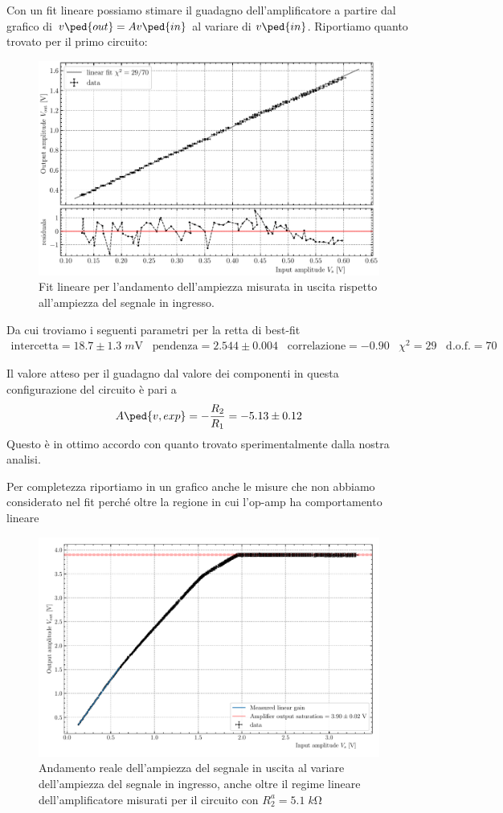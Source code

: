 \documentclass[10pt, a4paper, italian]{article}
\begin{document}
Con un fit lineare possiamo stimare il guadagno dell'amplificatore a partire
dal grafico di $v\ped{out} = A v\ped{in}$ al variare di $v\ped{in}$.
Riportiamo quanto trovato per il primo circuito:
\begin{figure}[htbp]
\centering
\includegraphics[scale=0.7]{gainfit}
\caption{Fit lineare per l'andamento dell'ampiezza misurata in uscita rispetto
all'ampiezza del segnale in ingresso. \label{fig: gainfit}}
\end{figure}
Da cui troviamo i seguenti parametri per la retta di best-fit
\begin{align*}
\text{intercetta} = 18.7 \pm 1.3 \; \si{m\V} \;\;\;
\text{pendenza} = 2.544 \pm 0.004 \;\;\; \text{correlazione} = -0.90
\;\;\; \chi^2 = 29 \;\;\; \text{d.o.f.} = 70
\end{align*}

Il valore atteso per il guadagno dal valore dei componenti in questa
configurazione del circuito è pari a
\[
A\ped{v, exp} = -\frac{R_2}{R_1} = - 5.13 \pm 0.12
\]
Questo è in ottimo accordo con quanto trovato sperimentalmente dalla nostra
analisi.

Per completezza riportiamo in un grafico anche le misure che non abbiamo
considerato nel fit perché oltre la regione in cui l'op-amp ha comportamento
lineare
\begin{figure}[htbp]
\centering
\includegraphics[scale=0.7]{VoutVs}
\caption{Andamento reale dell'ampiezza del segnale in uscita al variare
dell'ampiezza del segnale in ingresso, anche oltre il regime lineare
dell'amplificatore misurati per il circuito con $R_2^a = 5.1 \; \si{k\ohm}$
\label{fig: gainsat}}
\end{figure}
\end{document}
